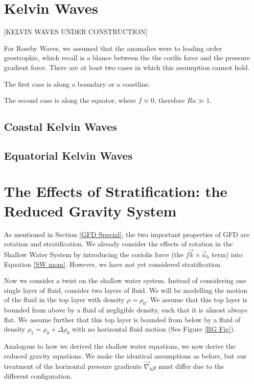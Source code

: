 \section{Kelvin Waves}

[KELVIN WAVES UNDER CONSTRUCTION]

For Rossby Waves, we assumed that the anomalies were to leading order geostrophic, which recall is a blance between the the corilis force and the pressure gradient force. There are at least two cases in which this assumption cannot hold.

The first case is along a boundary or a coastline.

The second case is along the equator, where $f\approx 0$, therefore $Ro \gg 1$. 

\subsection{Coastal Kelvin Waves}

\subsection{Equatorial Kelvin Waves}

\section{The Effects of Stratification: the Reduced Gravity System}

As mentioned in Section \ref{GFD Special}, the two important properties of GFD are rotation and stratification. We already consider the effects of rotation in the Shallow Water System by introducing the coriolis force (the $f\vec{k}\times\vec{u}_h$ term) into Equation \ref{SW mom}. However, we have not yet considered stratification.

Now we consider a twist on the shallow water system. Instead of considering one single layer of fluid, consider two layers of fluid. We will be modelling the motion of the fluid in the top layer with density $\rho=\rho_0$. We assume that this top layer is bounded from above by a fluid of negligible density, such that it is almost always flat. We assume further that this top layer is bounded from below by a fluid of density $\rho_1=\rho_0+\Delta \rho_0$ with no horizontal fluid motion (See Figure \ref{RG Fig}).

Analogous to how we derived the shallow water equations, we now derive the reduced gravity equations. We make the identical assumptions as before, but our treatment of the horizontal pressure gradients $\vec{\nabla}_h p$ must differ due to the different configuration.

